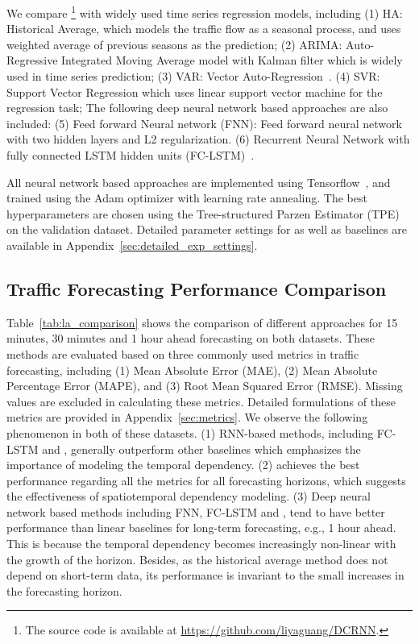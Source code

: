 \begin{table}[tbp]
{\begin{tabular}{c||c|c|cccccccc}
\bottomrule

\end{tabular}
}
\end{table}

We compare \gcrnn{}\footnote{The source code is available at \url{https://github.com/liyaguang/DCRNN}.} with widely used time series regression models, including
(1) HA: Historical Average, which models the traffic flow as a seasonal process, and uses weighted average of previous seasons as the prediction;
(2) ARIMA: Auto-Regressive Integrated Moving Average model with Kalman filter which is widely used in time series prediction; 
(3) VAR: Vector Auto-Regression~\citep{hamilton1994time}.
(4) SVR: Support Vector Regression which uses linear support vector machine for the regression task; 
The following deep neural network based approaches are also included:
(5) Feed forward Neural network (FNN): Feed forward neural network with two hidden layers and L2 regularization.
(6) Recurrent Neural Network with fully connected LSTM hidden units (FC-LSTM)~\citep{sutskever2014sequence}.

All neural network based approaches are implemented using Tensorflow~\citep{abadi2016tensorflow}, and trained using the Adam optimizer with learning rate annealing.
The best hyperparameters are chosen using the Tree-structured Parzen Estimator (TPE)~\citep{bergstra2011algorithms} on the validation dataset. 
Detailed parameter settings for \gcrnn{} as well as baselines are available in Appendix~\ref{sec:detailed_exp_settings}.


\vspace{-0.1in}
\subsection{Traffic Forecasting Performance Comparison}
Table~\ref{tab:la_comparison} shows the comparison of different approaches for 15 minutes, 30 minutes and 1 hour ahead forecasting on both datasets.
These methods are evaluated based on three commonly used metrics in traffic forecasting, including
(1)  Mean Absolute Error (MAE), (2) Mean Absolute Percentage Error (MAPE),  and (3) Root Mean Squared Error (RMSE).
Missing values are excluded in calculating these metrics. Detailed formulations of these metrics are provided in Appendix~\ref{sec:metrics}.
We observe the following phenomenon in both of these datasets.
(1) RNN-based methods, including FC-LSTM and \gcrnn{}, generally outperform other baselines which emphasizes the importance of modeling the temporal dependency.  
(2) \gcrnn{} achieves the best performance regarding all the metrics for all forecasting horizons, which suggests the effectiveness of spatiotemporal dependency modeling.
(3) Deep neural network based methods including FNN, FC-LSTM and \gcrnn{}, tend to have better performance than linear baselines for long-term forecasting, e.g., 1 hour ahead.  This is because the temporal dependency becomes increasingly non-linear with the growth of the horizon. 
Besides, as the historical average method does not depend on short-term data, its performance is invariant to the small increases in the forecasting horizon.

